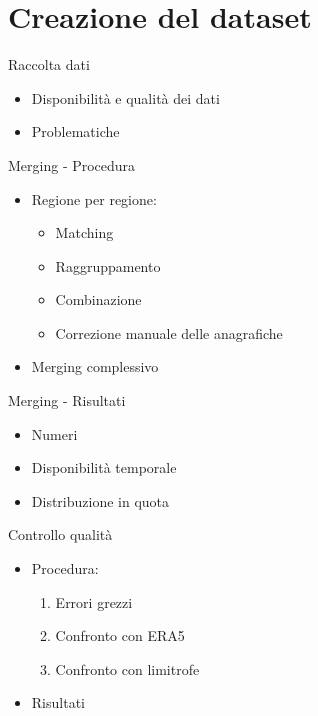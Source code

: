 
\section{Creazione del dataset}
\begin{frame}{Raccolta dati}
  \begin{itemize}
    \item Disponibilità e qualità dei dati
    \item Problematiche
  \end{itemize}
\end{frame}

\begin{frame}{Merging - Procedura}
  \begin{itemize}
    \item Regione per regione:
      \begin{itemize}
        \item Matching
        \item Raggruppamento
        \item Combinazione
        \item Correzione manuale delle anagrafiche
      \end{itemize}
    \item Merging complessivo
  \end{itemize}
\end{frame}

\begin{frame}{Merging - Risultati}
  \begin{itemize}
    \item Numeri
    \item Disponibilità temporale
    \item Distribuzione in quota
  \end{itemize}
\end{frame}

\begin{frame}{Controllo qualità}
  \begin{itemize}
    \item Procedura:
      \begin{enumerate}
        \item Errori grezzi
        \item Confronto con ERA5
        \item Confronto con limitrofe
      \end{enumerate}
    \item Risultati
  \end{itemize}
\end{frame}